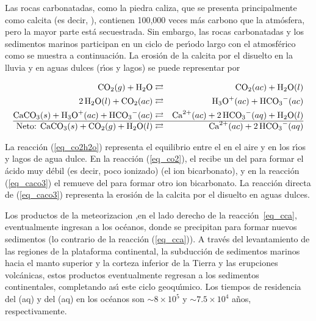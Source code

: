 Las rocas carbonatadas, como la piedra caliza, que se presenta principalmente como calcita (es decir, ), contienen 100,000 veces m\'as carbono que la atm\'osfera, pero la mayor parte est\'a secuestrada. Sin embargo, las rocas carbonatadas y los sedimentos marinos participan en un ciclo de per\'{\i}odo largo con el  atmosf\'erico como se muestra a continuaci\'on. La erosi\'on de la calcita por el  disuelto en la lluvia y en aguas dulces (r\'{\i}os y lagos) se puede representar por

\begin{footnotesize}
\begin{eqnarray}
\ce{CO2}(g) + \ce{H2O} &\rightleftarrows& \ce{CO2}(ac) + \ce{H2O}(l)  \label{eq_co2h2o}\\
\ce{2H2O}(l) +   \ce{CO2}(ac)&\rightleftarrows&   \ce{H3O^+}(ac) +  \ce{HCO3^-}(ac) \label{eq_co2}\\
\ce{CaCO3}(s) +   \ce{H3O^+}(ac) +  \ce{HCO3^-}(ac) &\rightleftarrows& \ce{Ca^{2+}}(ac) + \ce{2HCO3^-}(aq) + \ce{H2O}(l)\label{eq_caco3}\\\hline
\textrm{Neto:       }   \ce{CaCO3}(s) +\ce{CO2}(g) + \ce{H2O}(l)  &\rightleftarrows&\ce{Ca^{2+}}(ac) + \ce{2HCO3^-}(aq)  \label{eq_cca}
\end{eqnarray}
\end{footnotesize}

La reacci\'on (\ref{eq_co2h2o}) representa el equilibrio entre el  en el aire y en los r\'{\i}os y lagos de agua dulce. En la reacci\'on (\ref{eq_co2}), el  recibe un   del  para formar el \'acido muy d\'ebil (es decir, poco ionizado)  (el ion bicarbonato), y en la reacci\'on (\ref{eq_caco3}) el  remueve  del  para formar otro ion bicarbonato. La reacci\'on directa de (\ref{eq_caco3}) representa la erosi\'on de la calcita por el   disuelto en aguas dulces.

Los productos de la \gls{meteorizacion} ,en el lado derecho de la reacci\'on~\ref{eq_cca}, eventualmente ingresan a los oc\'eanos, donde se precipitan para formar nuevos sedimentos (lo contrario de la reacci\'on (\ref{eq_cca})). A trav\'es del levantamiento de las regiones de la plataforma continental, la subducci\'on de sedimentos marinos hacia el manto superior y la corteza inferior de la Tierra y las erupciones volc\'anicas, estos productos eventualmente regresan a los sedimentos continentales, completando as\'{\i} este ciclo geoqu\'{\i}mico. Los tiempos de residencia del (aq) y del (aq) en los oc\'eanos son $\sim 8\times 10^5$ y $\sim7.5 \times 10^4$ a\~nos, respectivamente.

